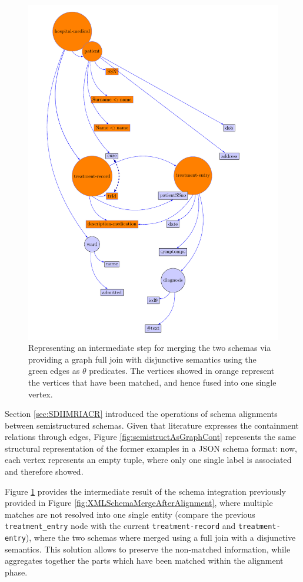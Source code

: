 \begin{figure}
\includegraphics[width=\textwidth]{fig/03joins/ontologyFullJoin}
\caption{Representing an intermediate step for merging the two schemas via providing a graph full join with disjunctive semantics using the green edges as $\theta$ predicates. The vertices showed in orange represent the vertices that have been matched, and hence fused into one single vertex.}
\label{fig:semistructAsMerged}
\end{figure}
\begin{example}
Section \vref{sec:SDIIMRIACR} introduced the operations of schema alignments between semistructured schemas. Given that literature expresses the containment relations through edges, Figure \vref{fig:semistructAsGraphCont} represents the same structural representation of the former examples in a JSON schema format: now, each vertex represents an empty tuple, where only one single label is associated and therefore showed.

Figure \ref{fig:semistructAsMerged} provides the intermediate result of the schema integration previously provided in Figure \vref{fig:XMLSchemaMergeAfterAlignment}, where multiple matches are not resolved into one single entity (compare the previous \texttt{treatment\_entry} node with the current \texttt{treatment-record} and \texttt{treatment-entry}), where the two schemas where merged using a full join with a disjunctive semantics. This solution allows to preserve the non-matched information, while aggregates together the parts which have been matched within the alignment phase.
\end{example}

